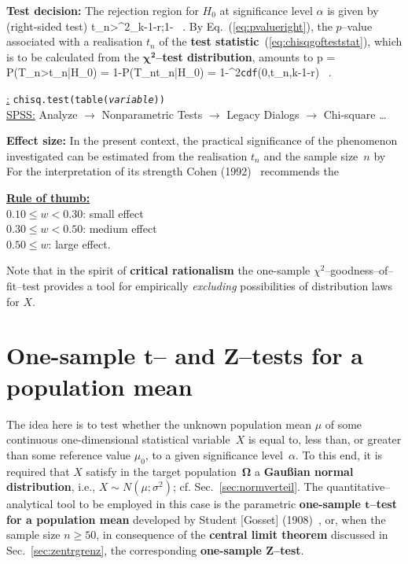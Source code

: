 \medskip
\noindent
\textbf{Test decision:} The rejection region for $H_{0}$ at 
significance level $\alpha$ is given by (right-sided test)
%
\be
t_{n}>\chi^{2}_{k-1-r;1-\alpha} \ .
\ee
%
By Eq.~(\ref{eq:pvalueright}), the $p$--value associated with a 
realisation $t_{n}$ of the \textbf{test
statistic}~(\ref{eq:chisqgofteststat}), which is to be calculated
from the $\boldsymbol{\chi^{2}}$\textbf{--test distribution},
amounts to
%
\be
p = P(T_{n}>t_{n}|H_{0}) = 1-P(T_{n}\leq t_{n}|H_{0})
= 1-\chi^{2}\texttt{cdf}(0,t_{n},k-1-r) \ .
\ee
%

\medskip
\noindent
\underline{\R:} \texttt{chisq.test(table(\textit{variable}))} \\
\underline{SPSS:} Analyze $\rightarrow$ Nonparametric Tests
$\rightarrow$ Legacy Dialogs $\rightarrow$ Chi-square \ldots

\medskip
\noindent
\textbf{Effect size:} In the present context, the practical
significance of the phenomenon investigated can be estimated
from the realisation $t_{n}$ and the sample size~$n$ by
%
\be
{}
\ee
%
For the interpretation of its strength Cohen 
(1992)~ recommends the

\medskip
\noindent
\underline{\textbf{Rule of thumb:}}\\
$0.10 \leq w < 0.30$: small effect\\
$0.30 \leq w < 0.50$: medium effect\\
$0.50 \leq w$: large effect.

\medskip
\noindent
Note that in the spirit of \textbf{critical rationalism} the 
one-sample $\chi^{2}$--goodness--of--fit--test provides a tool for 
empirically \textit{excluding} possibilities of distribution laws 
for $X$.

\section[One-sample $t$-- and $Z$--tests for a population 
mean]{One-sample $\boldsymbol{t}$-- and $\boldsymbol{Z}$--tests 
for a population mean}
The idea here is to test whether the unknown population mean $\mu$ 
of some continuous one-dimensional statistical variable~$X$ is 
equal to, less than, or greater than some reference value 
$\mu_{0}$, to a given significance level~$\alpha$. To this end, it 
is required that $X$ satisfy in the target 
population~$\boldsymbol{\Omega}$ a \textbf{Gau\ss ian normal 
distribution}, i.e., $X \sim N(\mu;\sigma^{2})$; cf. 
Sec.~\ref{sec:normverteil}. The quantitative--analytical tool to 
be employed in this case is the parametric \textbf{one-sample 
$\boldsymbol{t}$--test for a population mean} developed by Student 
[Gosset] (1908)~, or, when the sample size $n \geq 
50$, in consequence of the \textbf{central limit theorem} discussed 
in Sec.~\ref{sec:zentrgrenz}, the corresponding
\textbf{one-sample $\boldsymbol{Z}$--test}.

